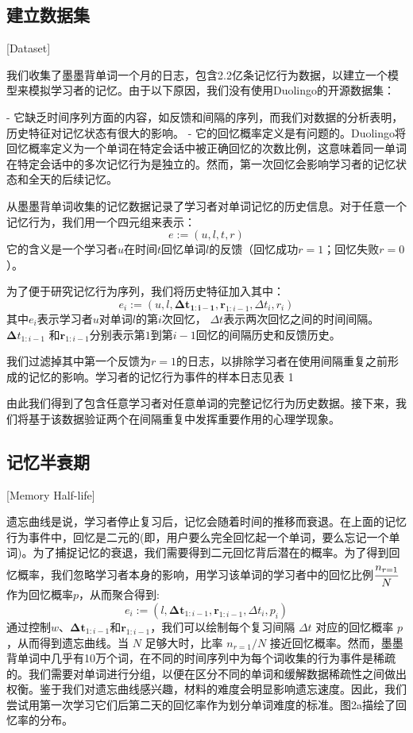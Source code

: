 \subsection{建立数据集}[Dataset]

我们收集了墨墨背单词一个月的日志，包含2.2亿条记忆行为数据，以建立一个模型来模拟学习者的记忆。由于以下原因，我们没有使用Duolingo的开源数据集：

- 它缺乏时间序列方面的内容，如反馈和间隔的序列，而我们对数据的分析表明，历史特征对记忆状态有很大的影响。
- 它的回忆概率定义是有问题的。Duolingo将回忆概率定义为一个单词在特定会话中被正确回忆的次数比例，这意味着同一单词在特定会话中的多次记忆行为是独立的。然而，第一次回忆会影响学习者的记忆状态和全天的后续记忆。

从墨墨背单词收集的记忆数据记录了学习者对单词记忆的历史信息。对于任意一个记忆行为，我们用一个四元组来表示：
\begin{equation}
e :=(u, l, t, r)
\end{equation}
它的含义是一个学习者$u$在时间$t$回忆单词$l$的反馈（回忆成功$r=1$；回忆失败$r=0$）。

为了便于研究记忆行为序列，我们将历史特征加入其中：
\begin{equation}
e_{i} :=(u, l, \boldsymbol{\Delta t_{1:i-1}}, \boldsymbol r_{1:i-1} , \Delta t_i , r_i)
\end{equation}
其中$e_i$表示学习者$u$对单词$l$的第$i$次回忆， $\Delta t$表示两次回忆之间的时间间隔。 $\boldsymbol \Delta t_{1:i-1}$  和$\boldsymbol r_{1:i-1}$分别表示第$1$到第$i-1$回忆的间隔历史和反馈历史。

我们过滤掉其中第一个反馈为$r=1$的日志，以排除学习者在使用间隔重复之前形成的记忆的影响。学习者的记忆行为事件的样本日志见表 1

由此我们得到了包含任意学习者对任意单词的完整记忆行为历史数据。接下来，我们将基于该数据验证两个在间隔重复中发挥重要作用的心理学现象。

\subsection{记忆半衰期}[Memory Half-life]

遗忘曲线是说，学习者停止复习后，记忆会随着时间的推移而衰退。在上面的记忆行为事件中，回忆是二元的(即，用户要么完全回忆起一个单词，要么忘记一个单词)。为了捕捉记忆的衰退，我们需要得到二元回忆背后潜在的概率。为了得到回忆概率，我们忽略学习者本身的影响，用学习该单词的学习者中的回忆比例$\cfrac{n_{r=1}}{N}$作为回忆概率$p$，从而聚合得到:
\begin{equation}
e_{i} :=(l, \boldsymbol{\Delta t}_{1:i-1}, \boldsymbol r_{1:i-1}, \Delta t_i , p_i)
\end{equation}
通过控制$w$、$\boldsymbol{\Delta t}_{1:i-1}$和$\boldsymbol r_{1:i-1}$，我们可以绘制每个复习间隔 $\Delta t$ 对应的回忆概率 $p$，从而得到遗忘曲线。当 $N$ 足够大时，比率 $n_{r=1}/N$ 接近回忆概率。然而，墨墨背单词中几乎有10万个词，在不同的时间序列中为每个词收集的行为事件是稀疏的。我们需要对单词进行分组，以便在区分不同的单词和缓解数据稀疏性之间做出权衡。鉴于我们对遗忘曲线感兴趣，材料的难度会明显影响遗忘速度。因此，我们尝试用第一次学习它们后第二天的回忆率作为划分单词难度的标准。图2a描绘了回忆率的分布。

